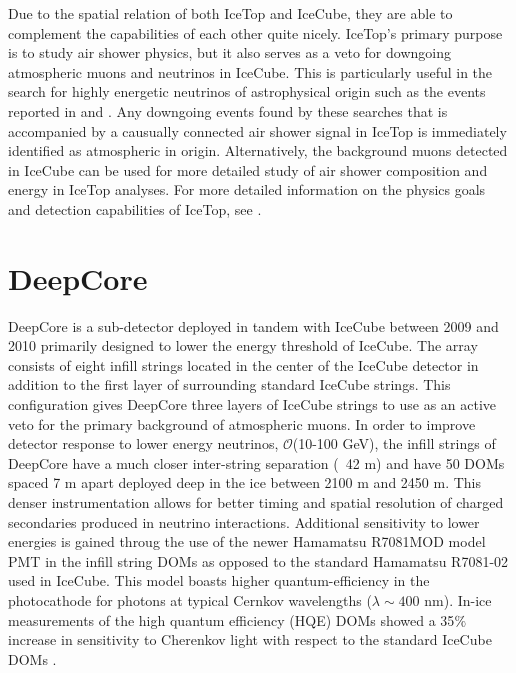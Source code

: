 \documentclass{gatech-thesis}
\begin{document}
Due to the spatial relation of both IceTop and IceCube, they are able to complement the capabilities of each other quite nicely. IceTop's primary purpose is to study air shower physics, but it also serves as a veto for downgoing atmospheric muons and neutrinos in IceCube. This is particularly useful in the search for highly energetic neutrinos of astrophysical origin such as the events reported in \cite{2013Sci...342E...1I} and \cite{2014PhRvL.113j1101A}. Any downgoing events found by these searches that is accompanied by a causually connected air shower signal in IceTop is immediately identified as atmospheric in origin. Alternatively, the background muons detected in IceCube can be used for more detailed study of air shower composition and energy in IceTop analyses. For more detailed information on the physics goals and detection capabilities of IceTop, see \cite{2013NIMPA.700..188A}.


\section{DeepCore}

DeepCore \cite{2012APh....35..615A} is a sub-detector deployed in tandem with IceCube between 2009 and 2010 primarily designed to lower the energy threshold of IceCube. The array consists of eight infill strings located in the center of the IceCube detector in addition to the first layer of surrounding standard IceCube strings. This configuration gives DeepCore three layers of IceCube strings to use as an active veto for the primary background of atmospheric muons. In order to improve detector response to lower energy neutrinos, $\mathcal{O}$(10-100 GeV), the infill strings of DeepCore have a much closer inter-string separation (~42 m) and have 50 DOMs spaced 7 m apart deployed deep in the ice between 2100 m and 2450 m. This denser instrumentation allows for better timing and spatial resolution of charged secondaries produced in neutrino interactions. Additional sensitivity to lower energies is gained throug the use of the newer Hamamatsu R7081MOD model PMT in the infill string DOMs as opposed to the standard Hamamatsu R7081-02 used in IceCube. This model boasts higher quantum-efficiency in the photocathode for photons at typical Cernkov wavelengths ($\lambda \sim 400$ nm). In-ice measurements of the high quantum efficiency (HQE) DOMs showed a 35$\%$ increase in sensitivity to Cherenkov light with respect to the standard IceCube DOMs \cite{2012APh....35..615A}.
\end{document}

